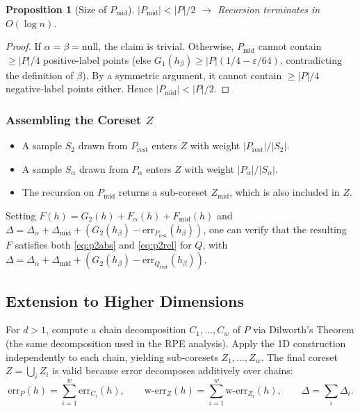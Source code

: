 \documentclass[11pt, a4paper]{article}
\theoremstyle{boxed}
\newtheorem{innerproposition}{Proposition}[section]
\newenvironment{proposition}
  {\begin{mdframed}[style=propstyle]\begin{innerproposition}}
  {\end{innerproposition}\end{mdframed}}
\begin{document}
\begin{proposition}[Size of $P_{\mathrm{mid}}$]\label{prop:midsize}
  $|P_{\mathrm{mid}}| < |P|/2$ $\rightarrow$ Recursion terminates in $O(\log n)$.
\end{proposition}
 
\begin{proof}
  If $\alpha = \beta = \mathrm{null}$, the claim is trivial. Otherwise, $P_{\mathrm{mid}}$ cannot contain $\ge |P|/4$ positive-label points (else $G_1(h_\beta) \ge |P|(1/4 - \varepsilon/64)$, contradicting the definition of $\beta$). By a symmetric argument, it cannot contain $\ge |P|/4$ negative-label points either. Hence $|P_{\mathrm{mid}}| < |P|/2$.
\end{proof}
 
\subsubsection{Assembling the Coreset $Z$}
 \begin{itemize}
  \item A sample $S_2$ drawn from $P_{\mathrm{rest}}$ enters $Z$ with weight $|P_{\mathrm{rest}}|/|S_2|$.
  \item A sample $S_\alpha$ drawn from $P_\alpha$ enters $Z$ with weight $|P_\alpha|/|S_\alpha|$.
  \item The recursion on $P_{\mathrm{mid}}$ returns a sub-coreset $Z_{\mathrm{mid}}$, which is also included in $Z$.
\end{itemize}
Setting $F(h) = G_2(h) + F_\alpha(h) + F_{\mathrm{mid}}(h)$ and $\Delta = \Delta_\alpha + \Delta_{\mathrm{mid}} + (G_2(h_\beta) - \mathrm{err}_{P_{\mathrm{rest}}}(h_\beta))$, one can verify that the resulting $F$ satisfies both \eqref{eq:p2abs}
and \eqref{eq:p2rel} for $Q$, with $\Delta = \Delta_\alpha + \Delta_{\mathrm{mid}}
+ (G_2(h_\beta) - \mathrm{err}_{Q_{\mathrm{rest}}}(h_\beta))$.
 
\subsection{Extension to Higher Dimensions}

For $d > 1$, compute a chain decomposition $C_1, \ldots, C_w$ of $P$
via Dilworth's Theorem (the same decomposition used in the RPE analysis).
Apply the 1D construction independently to each chain, yielding
sub-coresets $Z_1, \ldots, Z_w$.
The final coreset $Z = \bigcup_i Z_i$ is valid because error decomposes
additively over chains:
\[
  \mathrm{err}_P(h) = \sum_{i=1}^{w} \mathrm{err}_{C_i}(h),
  \qquad
  \mathrm{w\text{-}err}_Z(h) = \sum_{i=1}^{w} \mathrm{w\text{-}err}_{Z_i}(h),
  \qquad
  \Delta = \sum_i \Delta_i.
\]
 
\end{document}
